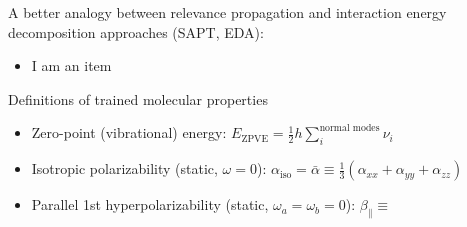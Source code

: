 \documentclass[xetex,compress]{beamer}
\begin{document}
\begin{frame}{A better analogy}
  between relevance propagation and interaction energy decomposition approaches (SAPT, EDA):
  \begin{itemize}
  \item I am an item
  \end{itemize}
\end{frame}






\begin{frame}{Definitions of trained molecular properties}
  \begin{itemize}
  \item Zero-point (vibrational) energy: \(E_{\text{ZPVE}} = \frac{1}{2} h \sum_{i}^{\text{normal modes}} \nu_{i}\)
  \item Isotropic polarizability (static, \(\omega = 0\)): \(\alpha_{\text{iso}} = \bar{\alpha} \equiv \frac{1}{3} (\alpha_{xx} + \alpha_{yy} + \alpha_{zz})\)
  \item Parallel 1st hyperpolarizability (static, \(\omega_{a} = \omega_{b} = 0\)): \(\beta_{\parallel} \equiv\)
  \end{itemize}
\end{frame}

\end{document}
